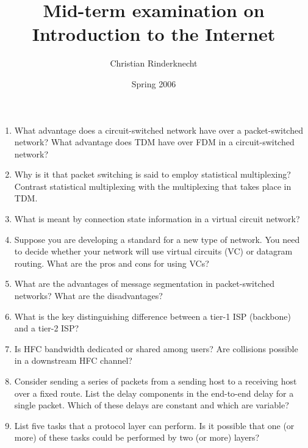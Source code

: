 \documentclass[11pt,a4paper]{article}
\title{Mid-term examination on\\ Introduction to the Internet}
\author{Christian Rinderknecht}
\date{Spring 2006}
\begin{document}
\maketitle
\thispagestyle{empty}

\begin{enumerate}

  \item What advantage does a circuit-switched network have over a
    packet-switched network? What advantage does TDM have over FDM in
    a circuit-switched network?

  \item Why is it that packet switching is said to employ statistical
    multiplexing? Contrast statistical multiplexing with the
    multiplexing that takes place in TDM.

  \item What is meant by connection state information in a virtual
    circuit network? 

  \item Suppose you are developing a standard for a new type of
    network. You need to decide whether your network will use virtual
    circuits (VC) or datagram routing. What are the pros and cons for
    using VCs?

  \item What are the advantages of message segmentation in
    packet-switched networks? What are the disadvantages?

  \item What is the key distinguishing difference between a tier-1 ISP
    (backbone) and a tier-2 ISP?

  \item Is HFC bandwidth dedicated or shared among users? Are
    collisions possible in a downstream HFC channel?

  \item Consider sending a series of packets from a sending host to a
    receiving host over a fixed route. List the delay components in
    the end-to-end delay for a single packet. Which of these delays
    are constant and which are variable?

  \item List five tasks that a protocol layer can perform. Is it
    possible that one (or more) of these tasks could be performed by
    two (or more) layers?
 
\end{enumerate}
\end{document}
